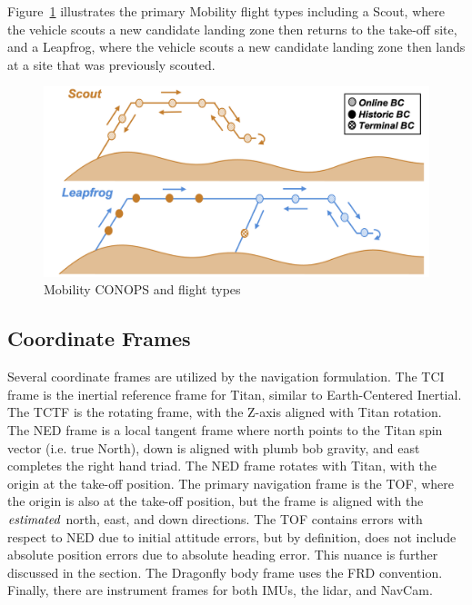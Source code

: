 Figure~\ref{fig:breadcrumbs} illustrates the primary Mobility flight types including a Scout, where the vehicle scouts a new candidate landing zone then returns to the take-off site, and a Leapfrog, where the vehicle scouts a new candidate landing zone then lands at a site that was previously scouted.
\begin{figure}[htbp]
	\centering\includegraphics[width=6in]{content/figures/breadcrumbs.png}
	\caption{Mobility CONOPS and flight types}
	\label{fig:breadcrumbs}
\end{figure}
\subsection{Coordinate Frames}

Several coordinate frames are utilized by the navigation formulation. The \ac{TCI} frame is the inertial reference frame for Titan, similar to Earth-Centered Inertial.\cite{Archinal} The \ac{TCTF} is the rotating frame, with the Z-axis aligned with Titan rotation. The \ac{NED} frame is a local tangent frame where north points to the Titan spin vector (i.e. true North), down is aligned with plumb bob gravity, and east completes the right hand triad. The NED frame rotates with Titan, with the origin at the take-off position. The primary navigation frame is the \ac{TOF}, where the origin is also at the take-off position, but the frame is aligned with the $\it{estimated}$ north, east, and down directions. The TOF contains errors with respect to NED due to initial attitude errors, but by definition, does not include absolute position errors due to absolute heading error. This nuance is further discussed in the  section. The Dragonfly body frame uses the \ac{FRD} convention. Finally, there are instrument frames for both \acp{IMU}, the lidar, and \ac{NavCam}. 
